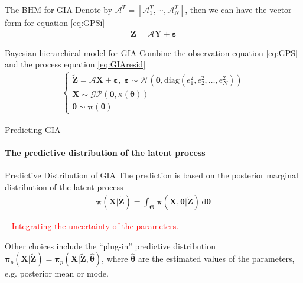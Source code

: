 \documentclass{beamer}
\newcommand{\ud}{\,\mathrm{d}}
\begin{document}
\begin{frame}{The BHM for GIA}
\vspace{0.3cm}
Denote by $\bm{\mathcal{A}}^T = \left[
 \bm{\mathcal{A}}_1^T, \cdots,\bm{\mathcal{A}}_N^T \right]$,
then we can have the vector form for equation \eqref{eq:GPSi}
\begin{align}\label{eq:GPS}
\bm{Z} = \bm{\mathcal{A}}\bm{Y} + \bm{\varepsilon} 
\end{align}
\begin{block}{Bayesian hierarchical model for GIA}
Combine the observation equation \eqref{eq:GPS} and the process equation \eqref{eq:GIAresid}
\begin{align}\label{eq:BHM}
\left\{ \begin{array}{l}
\bm{\tilde{Z}} = \bm{\mathcal{A}}\bm{X} + \bm{\varepsilon}, \; 
\bm{\varepsilon} \sim \mathcal{N} (\bm{0}, \mbox{diag}(e_1^2, e_2^2, \dots, e_N^2)) \\
\bm{X} \sim \mathcal{GP}(\bm{0}, \kappa(\bm{\theta})) \\
\bm{\theta} \sim \bm{\pi}(\bm{\theta})
\end{array} \right.
\end{align}
\end{block}

\end{frame}

\begin{frame}{Predicting GIA}
\framesubtitle{The predictive distribution of the latent process}
\begin{block}{Predictive Distribution of GIA}
The prediction is based on the posterior marginal distribution of the latent process 
\begin{align}
\bm{\pi}(\bm{X} | \bm{\tilde{Z}})= \int_{\bm{\Theta}} \bm{\pi}(\bm{X}, \bm{\theta}| \bm{\tilde{Z}})\ud \bm{\theta}
\end{align}

\textcolor{red}{-- Integrating the uncertainty of the parameters.}
\end{block}

Other choices include the ``plug-in'' predictive distribution $\bm{\pi}_{p}(\bm{X} | \bm{\tilde{Z}}) = \bm{\pi}_{p}(\bm{X} | \bm{\tilde{Z}}, \bm{\hat{\theta}})$, where $\bm{\hat{\theta}}$ are the estimated values of the parameters, e.g. posterior mean or mode.
\end{frame}
\end{document}
